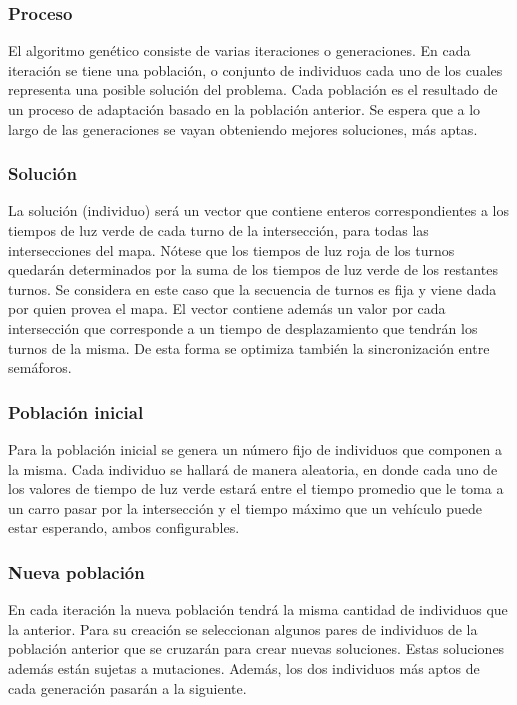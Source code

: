 \documentclass[colorinlistoftodos,twoside,twocolumn]{article} %
\begin{document}
	\subsubsection{Proceso}
	
	El algoritmo gen\'etico consiste de varias iteraciones o generaciones. En cada iteraci\'on se tiene una poblaci\'on, o conjunto de individuos cada uno de los cuales representa una posible soluci\'on del problema. Cada poblaci\'on es el resultado de un proceso de adaptaci\'on basado en la poblaci\'on anterior. Se espera que a lo largo de las generaciones se vayan obteniendo mejores soluciones, m\'as aptas.
	
	\subsubsection{Solución}
	
	La solución (individuo) será un vector que contiene enteros correspondientes a los tiempos de luz verde de cada turno de la intersección, para todas las intersecciones del mapa. N\'otese que los tiempos de luz roja de los turnos quedar\'an determinados por la suma de los tiempos de luz verde de los restantes turnos. Se considera en este caso que la secuencia de turnos es fija y viene dada por quien provea el mapa. El vector contiene adem\'as un valor por cada intersecci\'on que corresponde a un tiempo de desplazamiento que tendr\'an los turnos de la misma. De esta forma se optimiza tambi\'en la sincronizaci\'on entre sem\'aforos. 
	
	\subsubsection{Población inicial}
	
	Para  la población inicial se genera un n\'umero fijo de individuos que componen a la misma. Cada individuo se hallará de manera aleatoria, en donde cada uno de los valores de tiempo de luz verde estará entre el tiempo promedio que le toma a un carro pasar por la intersección y el tiempo máximo que un vehículo puede estar esperando, ambos configurables. 
	
	\subsubsection{Nueva población}
	En cada iteraci\'on la nueva poblaci\'on tendr\'a la misma cantidad de individuos que la anterior. Para su creaci\'on se seleccionan algunos pares de individuos de la poblaci\'on anterior que se cruzar\'an para crear nuevas soluciones. Estas soluciones adem\'as est\'an sujetas a mutaciones. Adem\'as, los dos individuos m\'as aptos de cada generaci\'on pasar\'an a la siguiente.  
	
\end{document}
